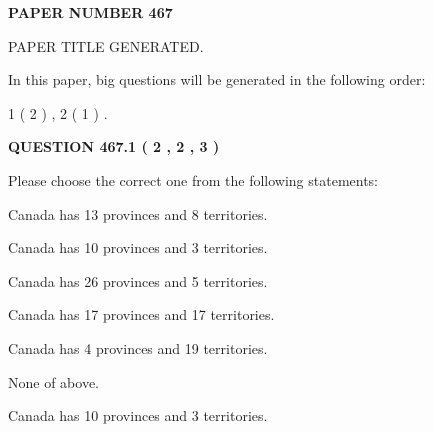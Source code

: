 \documentclass[12pt]{article}
\begin{document}
   
   
   
\newpage 
\setcounter{page}{ 
   467001 } 
   
   
   
   
 {\textbf{ \Large{ PAPER NUMBER  467  }}}
   
   
\vspace{0.2in}
   
   
   
   
   
   
   
   
 \vspace{0.2in}
 
 
 
 
   
   
 PAPER TITLE GENERATED.
   
   
   
\vspace{0.2in}
   
In this paper, big questions will be generated in the following order: 
   
   
   1 ( 2 )
 ,
   2 ( 1 )
 .
  
\vspace{0.2in}
  
{\textbf{\Large{QUESTION
467.1 
 ( 2 , 2 , 3 )
}}}
  
  
Please choose the correct one from the following statements:
 
 
Canada has  13 provinces and  8 territories.
 
 
Canada has 10  provinces and 3 territories.
 
 
Canada has  26 provinces and  5 territories.
 
 
Canada has  17 provinces and  17 territories.
 
 
Canada has   4 provinces and  19 territories.
 
 
 None of above.
 
 
\noindent{}
 
 
Canada has 10  provinces and 3 territories.
 
 
\noindent{}
 
\end{document}
